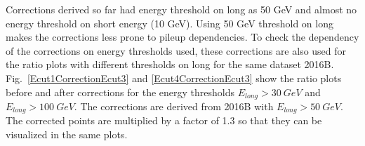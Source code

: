 Corrections derived so far had energy threshold on long as 50 GeV and almost no energy threshold on short energy (10 GeV). Using 50 GeV threshold on long makes the corrections less prone to pileup dependencies. To check the dependency of the corrections on energy thresholds used, these corrections are also used for the ratio plots with different thresholds on long for the same dataset 2016B. Fig.~\ref{Ecut1CorrectionEcut3} and \ref{Ecut4CorrectionEcut3} show the ratio plots before and after corrections for the energy thresholds $E_{long} > 30~GeV$ and $E_{long} > 100~GeV$. The corrections are derived from 2016B with $E_{long} > 50~GeV$. The corrected points are multiplied by a factor of 1.3 so that they can be visualized in the same plots. %
